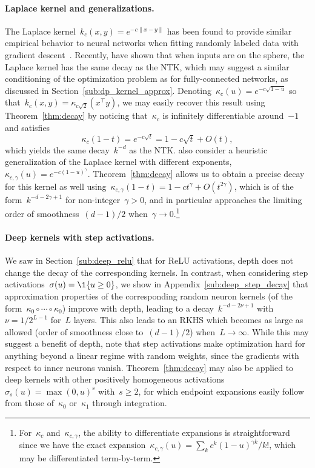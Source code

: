 \paragraph{Laplace kernel and generalizations.}
The Laplace kernel~$k_{c}(x, y) = e^{-c\|x - y\|}$ has been found to provide similar empirical behavior to neural networks when fitting randomly labeled data with gradient descent~\citep{belkin2018understand}.
Recently, \citet{geifman2020similarity} have shown that when inputs are on the sphere, the Laplace kernel has the same decay as the NTK, which may suggest a similar conditioning of the optimization problem as for fully-connected networks, as discussed in Section~\ref{sub:dp_kernel_approx}.
Denoting~$\kappa_{c}(u) = e^{-c\sqrt{1-u}}$ so that~$k_{c}(x, y) = \kappa_{c\sqrt{2}}(x^\top y)$, we may easily recover this result using Theorem~\ref{thm:decay} by noticing that~$\kappa_{c}$ is infinitely differentiable around~$-1$ and satisfies
\begin{equation*}
\kappa_c(1-t) = e^{-c\sqrt{t}} = 1 - c\sqrt{t} + O(t),
\end{equation*}
which yields the same decay~$k^{-d}$ as the NTK.
\citet{geifman2020similarity} also consider a heuristic generalization of the Laplace kernel with different exponents, $\kappa_{c,\gamma}(u) = e^{-c(1-u)^\gamma}$.
Theorem~\ref{thm:decay} allows us to obtain a precise decay for this kernel as well using~$\kappa_{c,\gamma}(1-t) = 1 - c t^\gamma + O(t^{2 \gamma})$, which is of the form~$k^{-d-2 \gamma+1}$ for non-integer~$\gamma > 0$, and in particular approaches the limiting order of smoothness~$(d-1)/2$ when~$\gamma \to 0$.\footnote{For~$\kappa_c$ and~$\kappa_{c,\gamma}$, the ability to differentiate expansions is straightforward since we have the exact expansion~$\kappa_{c,\gamma}(u) = \sum_k c^k (1 - u)^{\gamma k} / k!$, which may be differentiated term-by-term.}

\paragraph{Deep kernels with step activations.}
We saw in Section~\ref{sub:deep_relu} that for ReLU activations, depth does not change the decay of the corresponding kernels.
In contrast, when considering step activations~$\sigma(u) = \1\{u \geq 0\}$, we show in Appendix~\ref{sub:deep_step_decay} that approximation properties of the corresponding random neuron kernels (of the form~$\kappa_0 \circ \cdots \circ \kappa_0$) improve with depth, leading to a decay~$k^{-d-2 \nu+1}$ with $\nu = 1/2^{L-1}$ for~$L$ layers. This also leads to an RKHS which becomes as large as allowed (order of smoothness close to~$(d-1)/2$) when~$L \to \infty$.
While this may suggest a benefit of depth, note that step activations make optimization hard for anything beyond a linear regime with random weights, since the gradients with respect to inner neurons vanish.
Theorem~\ref{thm:decay} may also be applied to deep kernels with other positively homogeneous activations~$\sigma_s(u) = \max(0, u)^s$ with~$s \geq 2$, for which endpoint expansions easily follow from those of~$\kappa_0$ or~$\kappa_1$ through integration.

